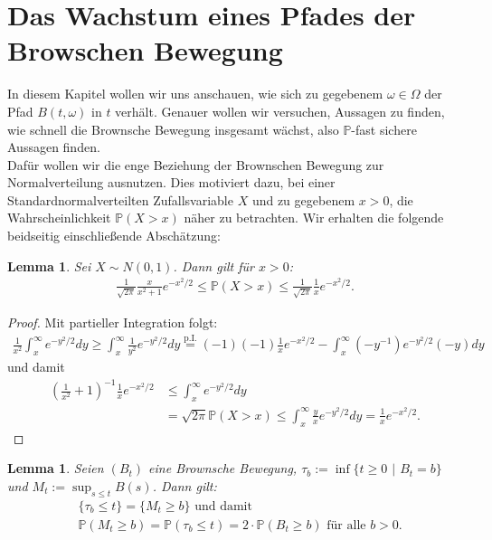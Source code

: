 \documentclass[12pt,a4paper]{scrartcl}
\numberwithin{equation}{section}
\numberwithin{equation}{section}%
\newtheorem{lem}[thm]{Lemma}%
\theoremstyle{definition}
\begin{document}
\section{Das Wachstum eines Pfades der Browschen Bewegung}
\noindent In diesem Kapitel wollen wir uns anschauen, wie sich zu gegebenem $\omega \in \Omega$ der Pfad $B(t,\omega)$ in $t$ verhält. Genauer wollen wir versuchen, Aussagen zu finden, wie schnell die Brownsche Bewegung insgesamt wächst, also $\mathbb{P}$-fast sichere Aussagen finden.\\
Dafür wollen wir die enge Beziehung der Brownschen Bewegung zur Normalverteilung ausnutzen. Dies motiviert dazu, bei einer Standardnormalverteilten Zufallsvariable $X$ und zu gegebenem $x>0$, die Wahrscheinlichkeit $\mathbb{P}(X>x)$ näher zu betrachten. Wir erhalten die folgende beidseitig einschließende Abschätzung:
\begin{lem}
Sei $X \sim N(0,1)$. Dann gilt für $x>0$:
\begin{align}\label{eq:Schlange}
\frac{1}{\sqrt{2\pi}} \frac{x}{x^2+1} e^{-x^2/2} \leq \mathbb{P}(X>x)\leq \frac{1}{\sqrt{2\pi}} \frac{1}{x} e^{-x^2/2}.
\end{align}
\end{lem}
\begin{proof} Mit partieller Integration folgt:
\begin{align*}
\frac{1}{x^2} \int_x^\infty e^{-y^2/2}dy\geq \int_x^\infty \frac{1}{y^2} e^{-y^2/2} dy \overset{\text{p.I.}}= (-1)(-1)\frac{1}{x}e^{-x^2/2} - \int_x^\infty (-y^{-1})e^{-y^2/2}(-y)dy
\end{align*}
und damit
\begin{align*}
\left(\frac{1}{x^2}+1 \right) ^{-1} \frac{1}{x} e^{-x^2/2}
&\leq \int_x^\infty e^{-y^2/2}dy \\
&= \sqrt{2\pi} \mathbb{P}(X>x)
\leq \int_x^\infty{\frac{y}{x} e^{-y^2/2}dy}
= \frac{1}{x}e^{-x^2/2}.
\end{align*}
\end{proof}

\begin{lem}\label{eq:MaxAbschaetzung}
Seien $(B_t)$ eine Brownsche Bewegung, $\tau_b:= \inf \{ t\geq 0$ $\vert$ $B_t=b\}$ und $M_t:=\sup_{s\leq t} B(s)$. Dann gilt:
\begin{align*}
&\{ \tau_b  \leq t \} = \{ M_t \geq b \} \text{ und damit }\\
&\mathbb{P} (M_t \geq b ) = \mathbb{P}(\tau_b \leq t ) = 2\cdot \mathbb{P} (B_t \geq b) \text{ für alle } b > 0.
\end{align*}
\end{lem}
\end{document}

